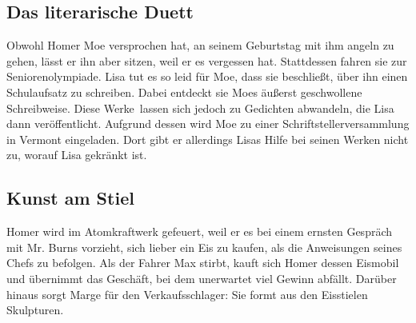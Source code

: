 \subsection{Das literarische Duett}
Obwohl Homer Moe versprochen hat, an seinem Geburtstag mit ihm angeln zu gehen, lässt er ihn aber sitzen, weil er es vergessen hat. Stattdessen fahren sie zur Seniorenolympiade. Lisa tut es so leid für Moe, dass sie beschließt, über ihn einen Schulaufsatz zu schreiben. Dabei entdeckt sie Moes äußerst geschwollene Schreibweise. Diese \glqq Werke\grqq\ lassen sich jedoch zu Gedichten abwandeln, die Lisa dann veröffentlicht. Aufgrund dessen wird Moe zu einer Schriftstellerversammlung in Vermont eingeladen. Dort gibt er allerdings Lisas Hilfe bei seinen Werken nicht zu, worauf Lisa gekränkt ist.


\subsection{Kunst am Stiel}\label{HABF22}
Homer wird im Atomkraftwerk gefeuert, weil er es bei einem ernsten Gespräch mit Mr. Burns vorzieht, sich lieber ein Eis zu kaufen, als die Anweisungen seines Chefs zu befolgen. Als der Fahrer Max stirbt, kauft sich Homer dessen Eismobil und übernimmt das Geschäft, bei dem unerwartet viel Gewinn abfällt. Darüber hinaus sorgt Marge für den Verkaufsschlager: Sie formt aus den Eisstielen Skulpturen.


